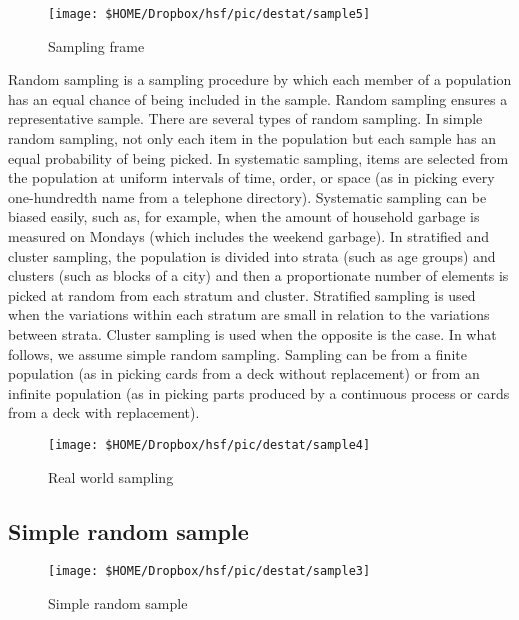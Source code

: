 \begin{figure}[h]
	\centering
	\texttt{[image: \$HOME/Dropbox/hsf/pic/destat/sample5]}
	
		\caption{Sampling frame}
\end{figure}

Random sampling is a sampling procedure by which each member of a population has an equal chance of
being included in the sample. Random sampling ensures a representative sample. There are several types of
random sampling. In simple random sampling, not only each item in the population but each sample has an
equal probability of being picked. In systematic sampling, items are selected from the population at uniform
intervals of time, order, or space (as in picking every one-hundredth name from a telephone directory).
Systematic sampling can be biased easily, such as, for example, when the amount of household garbage is
measured on Mondays (which includes the weekend garbage). In stratified and cluster sampling, the population is divided into strata (such as age groups) and clusters (such as blocks of a city) and then a proportionate
number of elements is picked at random from each stratum and cluster. Stratified sampling is used when the
variations within each stratum are small in relation to the variations between strata. Cluster sampling is used
when the opposite is the case. In what follows, we assume simple random sampling. Sampling can be from a
finite population (as in picking cards from a deck without replacement) or from an infinite population (as in
picking parts produced by a continuous process or cards from a deck with replacement).

\begin{figure}[h]
	\centering
	\texttt{[image: \$HOME/Dropbox/hsf/pic/destat/sample4]}
	\caption{Real world sampling}
	
\end{figure}



\subsection{Simple random sample}

\begin{figure}[h]
	\centering
	\texttt{[image: \$HOME/Dropbox/hsf/pic/destat/sample3]}
	\caption{Simple random sample}
	
\end{figure}



